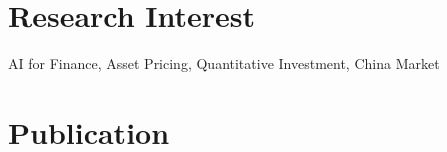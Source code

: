 \documentclass{clean_cv}
\begin{document}
\section{Research Interest}
\begin{center}
	AI for Finance, Asset Pricing, Quantitative Investment, China Market
\end{center}

\section{Publication}
\end{document}
